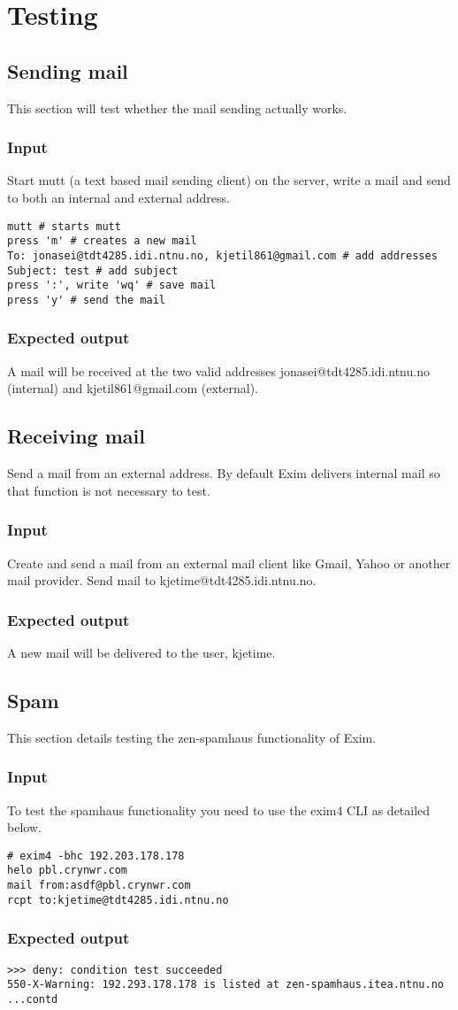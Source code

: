 \section{Testing}
\subsection{Sending mail}
This section will test whether the mail sending actually works.
\subsubsection{Input}
Start mutt (a text based mail sending client) on the server, write a
mail and send to both an internal and external address.
\begin{lstlisting}
mutt # starts mutt
press 'm' # creates a new mail
To: jonasei@tdt4285.idi.ntnu.no, kjetil861@gmail.com # add addresses
Subject: test # add subject
press ':', write 'wq' # save mail
press 'y' # send the mail
\end{lstlisting}
\subsubsection{Expected output}
A mail will be received at the two valid addresses
jonasei@tdt4285.idi.ntnu.no (internal) and kjetil861@gmail.com
(external).
\subsection{Receiving mail}
Send a mail from an external address. By default Exim delivers internal
mail so that function is not necessary to test.
\subsubsection{Input}
Create and send a mail from an external mail client like Gmail, Yahoo or
another mail provider. Send mail to kjetime@tdt4285.idi.ntnu.no.
\subsubsection{Expected output}
A new mail will be delivered to the user, kjetime.
\subsection{Spam}
This section details testing the zen-spamhaus functionality of Exim.
\subsubsection{Input}
To test the spamhaus functionality you need to use the exim4 CLI as detailed below.
\begin{lstlisting}
# exim4 -bhc 192.203.178.178
helo pbl.crynwr.com
mail from:asdf@pbl.crynwr.com
rcpt to:kjetime@tdt4285.idi.ntnu.no
\end{lstlisting}

\subsubsection{Expected output}
\begin{lstlisting}
>>> deny: condition test succeeded
550-X-Warning: 192.293.178.178 is listed at zen-spamhaus.itea.ntnu.no
...contd
\end{lstlisting}

